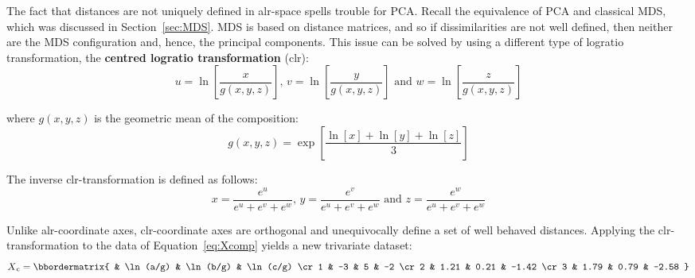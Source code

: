 The fact that distances are not uniquely defined in alr-space spells
trouble for PCA. Recall the equivalence of PCA and classical MDS,
which was discussed in Section~\ref{sec:MDS}. MDS is based on distance
matrices, and so if dissimilarities are not well defined, then neither
are the MDS configuration and, hence, the principal components. This
issue can be solved by using a different type of logratio
transformation, the \textbf{centred logratio transformation} (clr):
\begin{equation}
  u = \ln\!\left[\frac{x}{g(x,y,z)}\right] \mbox{,~}
  v = \ln\!\left[\frac{y}{g(x,y,z)}\right] \mbox{~and~}
  w = \ln\!\left[\frac{z}{g(x,y,z)}\right]
  \label{eq:clr}
\end{equation}

\noindent where $g(x,y,z)$ is the geometric mean of the composition:
\[
g(x,y,z) = \exp\!\left[\frac{\ln[x]+\ln[y]+\ln[z]}{3}\right]
\]

The inverse clr-transformation is defined as follows:
\begin{equation}
    x = \frac{e^u}{e^u+e^v+e^w} \mbox{,~}
    y = \frac{e^v}{e^u+e^v+e^w} \mbox{~and~}
    z = \frac{e^w}{e^u+e^v+e^w}
\end{equation}

Unlike alr-coordinate axes, clr-coordinate axes are orthogonal and
unequivocally define a set of well behaved distances. Applying the
clr-transformation to the data of Equation~\ref{eq:Xcomp} yields a new
trivariate dataset:
\begin{equation}
  X\textsubscript{c} =
  \bbordermatrix{ & \ln(a/g) & \ln(b/g) & \ln(c/g) \cr
    1 & -3 & 5 & -2 \cr
    2 & 1.21  & 0.21 & -1.42 \cr
    3 & 1.79  & 0.79 & -2.58
  }
  \label{eq:Xc}
\end{equation}

